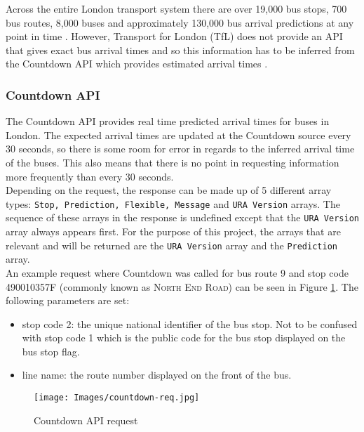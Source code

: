 Across the entire London transport system there are over 19,000 bus stops, 700 bus routes, 8,000 buses and approximately 130,000 bus arrival predictions at any point in time \cite{tfl-bus-documentation}. However, Transport for London (TfL) does not provide an API that gives exact bus arrival times and so this information has to be inferred from the Countdown API which provides estimated arrival times \cite{tfl-api}.

\subsubsection{Countdown API}

The Countdown API provides real time predicted arrival times for buses in London. The expected arrival times are updated at the Countdown source every 30 seconds, so there is some room for error in regards to the inferred arrival time of the buses. This also means that there is no point in requesting information more frequently than every 30 seconds. \\

Depending on the request, the response can be made up of 5 different array types: \texttt{Stop, Prediction, Flexible, Message} and \texttt{URA Version} arrays. The sequence of these arrays in the response is undefined except that the \texttt{URA Version} array always appears first. For the purpose of this project, the arrays that are relevant and will be returned are the \texttt{URA Version} array and the \texttt{Prediction} array. \\

An example request where Countdown was called for bus route 9 and stop code 490010357F (commonly known as \textsc{North End Road}) can be seen in Figure \ref{fig:countdown-req}. The following parameters are set: 
\begin{itemize}
    \item stop code 2: the unique national identifier of the bus stop. Not to be confused with stop code 1 which is the public code for the bus stop displayed on the bus stop flag.
    \item line name: the route number displayed on the front of the bus.
\end{itemize}

\begin{figure}[H]
\begin{center}
    \texttt{[image: Images/countdown-req.jpg]}
    \caption{Countdown API request}
    \label{fig:countdown-req}
\end{center}
\end{figure}

